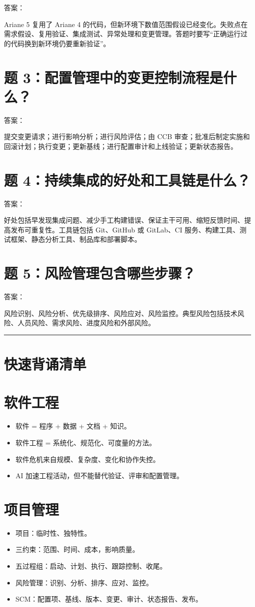 \documentclass[UTF8,zihao=-4]{ctexart}
\begin{document}
答案：

Ariane 5 复用了 Ariane 4 的代码，但新环境下数值范围假设已经变化。失败点在需求假设、复用验证、集成测试、异常处理和变更管理。答题时要写“正确运行过的代码换到新环境仍要重新验证”。

\section{题 3：配置管理中的变更控制流程是什么？}

答案：

提交变更请求；进行影响分析；进行风险评估；由 CCB 审查；批准后制定实施和回滚计划；执行变更；更新基线；进行配置审计和上线验证；更新状态报告。

\section{题 4：持续集成的好处和工具链是什么？}

答案：

好处包括早发现集成问题、减少手工构建错误、保证主干可用、缩短反馈时间、提高发布可重复性。工具链包括 Git、GitHub 或 GitLab、CI 服务、构建工具、测试框架、静态分析工具、制品库和部署脚本。

\section{题 5：风险管理包含哪些步骤？}

答案：

风险识别、风险分析、优先级排序、风险应对、风险监控。典型风险包括技术风险、人员风险、需求风险、进度风险和外部风险。

\bigskip\hrule\bigskip

\section{快速背诵清单}

\section{软件工程}

\begin{itemize}
\item 软件 = 程序 + 数据 + 文档 + 知识。
\item 软件工程 = 系统化、规范化、可度量的方法。
\item 软件危机来自规模、复杂度、变化和协作失控。
\item AI 加速工程活动，但不能替代验证、评审和配置管理。
\end{itemize}

\section{项目管理}

\begin{itemize}
\item 项目：临时性、独特性。
\item 三约束：范围、时间、成本，影响质量。
\item 五过程组：启动、计划、执行、跟踪控制、收尾。
\item 风险管理：识别、分析、排序、应对、监控。
\item SCM：配置项、基线、版本、变更、审计、状态报告、发布。
\end{itemize}
\end{document}
